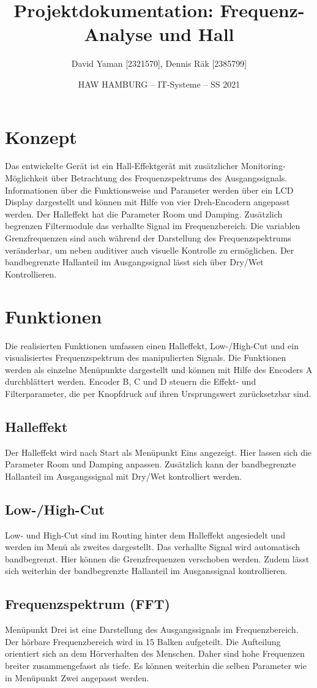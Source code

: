 \documentclass[12pt]{article}
\title{Projektdokumentation: Frequenz-Analyse und Hall}        %
\author{David Yaman [2321570], Dennis Räk [2385799]}            %
\date{HAW HAMBURG -- IT-Systeme -- SS 2021}                    %
\begin{document}
\maketitle
\newpage
\tableofcontents
\newpage
\section{Konzept}
Das entwickelte Gerät ist ein Hall-Effektgerät mit zusätzlicher Monitoring-Möglichkeit über Betrachtung des Frequenzspektrums des Ausgangssignals. 
Informationen über die Funktionsweise und Parameter werden über ein LCD Display dargestellt und können mit Hilfe von vier Dreh-Encodern angepasst werden. 
Der Halleffekt hat die Parameter Room und Damping. Zusätzlich begrenzen Filtermodule das verhallte Signal im Frequenzbereich. 
Die variablen Grenzfrequenzen sind auch während der Darstellung des Frequenzspektrums veränderbar, um neben auditiver auch visuelle Kontrolle zu ermöglichen. 
Der bandbegrenzte Hallanteil im Ausgangssignal lässt sich über Dry/Wet Kontrollieren.
\section{Funktionen}
Die realisierten Funktionen umfassen einen Halleffekt, Low-/High-Cut und ein visualisiertes Frequenzspektrum des manipulierten Signals. 
Die Funktionen werden als einzelne Menüpunkte dargestellt und können mit Hilfe des Encoders A durchblättert werden. 
Encoder B, C und D steuern die Effekt- und Filterparameter, die per Knopfdruck auf ihren Ursprungswert zurücksetzbar sind.
\subsection{Halleffekt}
Der Halleffekt wird nach Start als Menüpunkt Eins angezeigt. 
Hier lassen sich die Parameter Room und Damping anpassen.
Zusätzlich kann der bandbegrenzte Hallanteil im Ausgangssignal mit Dry/Wet kontrolliert werden.
\subsection{Low-/High-Cut}
Low- und High-Cut sind im Routing hinter dem Halleffekt angesiedelt und werden im Menü als zweites dargestellt. 
Das verhallte Signal wird automatisch bandbegrenzt.  
Hier können die Grenzfrequenzen verschoben werden. 
Zudem lässt sich weiterhin der bandbegrenzte Hallanteil im Ausganssignal kontrollieren. 
\subsection{Frequenzspektrum (FFT)}
Menüpunkt Drei ist eine Darstellung des Ausgangssignals im Frequenzbereich. 
Der hörbare Frequenzbereich wird in 15 Balken aufgeteilt. Die Aufteilung orientiert sich an dem Hörverhalten des Menschen. 
Daher sind hohe Frequenzen breiter zusammengefasst als tiefe. 
Es können weiterhin die selben Parameter wie in Menüpunkt Zwei angepasst werden.
\newpage
\end{document}
